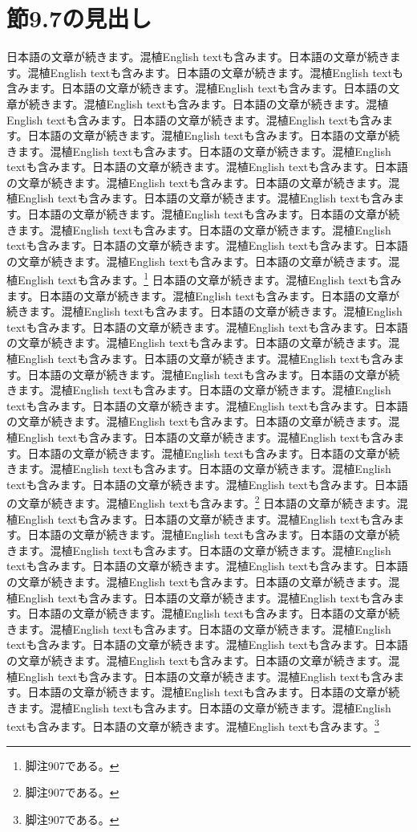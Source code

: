 \documentclass[pdflatex,book]{jlreq}
\begin{document}
\section{節9.7の見出し}
日本語の文章が続きます。混植English textも含みます。日本語の文章が続きます。混植English textも含みます。日本語の文章が続きます。混植English textも含みます。日本語の文章が続きます。混植English textも含みます。日本語の文章が続きます。混植English textも含みます。日本語の文章が続きます。混植English textも含みます。日本語の文章が続きます。混植English textも含みます。日本語の文章が続きます。混植English textも含みます。日本語の文章が続きます。混植English textも含みます。日本語の文章が続きます。混植English textも含みます。日本語の文章が続きます。混植English textも含みます。日本語の文章が続きます。混植English textも含みます。日本語の文章が続きます。混植English textも含みます。日本語の文章が続きます。混植English textも含みます。日本語の文章が続きます。混植English textも含みます。日本語の文章が続きます。混植English textも含みます。日本語の文章が続きます。混植English textも含みます。日本語の文章が続きます。混植English textも含みます。日本語の文章が続きます。混植English textも含みます。日本語の文章が続きます。混植English textも含みます。\footnote{脚注907である。}
日本語の文章が続きます。混植English textも含みます。日本語の文章が続きます。混植English textも含みます。日本語の文章が続きます。混植English textも含みます。日本語の文章が続きます。混植English textも含みます。日本語の文章が続きます。混植English textも含みます。日本語の文章が続きます。混植English textも含みます。日本語の文章が続きます。混植English textも含みます。日本語の文章が続きます。混植English textも含みます。日本語の文章が続きます。混植English textも含みます。日本語の文章が続きます。混植English textも含みます。日本語の文章が続きます。混植English textも含みます。日本語の文章が続きます。混植English textも含みます。日本語の文章が続きます。混植English textも含みます。日本語の文章が続きます。混植English textも含みます。日本語の文章が続きます。混植English textも含みます。日本語の文章が続きます。混植English textも含みます。日本語の文章が続きます。混植English textも含みます。日本語の文章が続きます。混植English textも含みます。日本語の文章が続きます。混植English textも含みます。日本語の文章が続きます。混植English textも含みます。\footnote{脚注907である。}
日本語の文章が続きます。混植English textも含みます。日本語の文章が続きます。混植English textも含みます。日本語の文章が続きます。混植English textも含みます。日本語の文章が続きます。混植English textも含みます。日本語の文章が続きます。混植English textも含みます。日本語の文章が続きます。混植English textも含みます。日本語の文章が続きます。混植English textも含みます。日本語の文章が続きます。混植English textも含みます。日本語の文章が続きます。混植English textも含みます。日本語の文章が続きます。混植English textも含みます。日本語の文章が続きます。混植English textも含みます。日本語の文章が続きます。混植English textも含みます。日本語の文章が続きます。混植English textも含みます。日本語の文章が続きます。混植English textも含みます。日本語の文章が続きます。混植English textも含みます。日本語の文章が続きます。混植English textも含みます。日本語の文章が続きます。混植English textも含みます。日本語の文章が続きます。混植English textも含みます。日本語の文章が続きます。混植English textも含みます。日本語の文章が続きます。混植English textも含みます。\footnote{脚注907である。}
\end{document}
